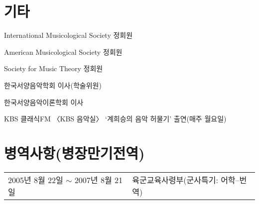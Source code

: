 \documentclass[dvipdfmx,a4paper]{article}
\begin{document}
  \vspace{2.5mm}
  
  \section*{\normalsize 기타}
  
  
  
  \noindent \hspace{2mm} \textbullet \hspace{2mm} International Musicological Society 정회원
  
  \noindent \hspace{2mm} \textbullet \hspace{2mm} American Musicological Society 정회원
  
  \noindent \hspace{2mm} \textbullet \hspace{2mm} Society for Music Theory 정회원
  
  \noindent \hspace{2mm} \textbullet \hspace{2mm} 한국서양음악학회 이사(학술위원)
  
  \noindent \hspace{2mm} \textbullet \hspace{2mm} 한국서양음악이론학회 이사
  
  \noindent \hspace{2mm} \textbullet \hspace{2mm} KBS 클래식FM 〈KBS 음악실〉 ‘계희승의 음악 허물기’ 출연(매주 월요일)


  \vspace{2.5mm}
  
  \section*{\normalsize 병역사항(병장만기전역)}
  
  \hspace*{-0.25cm}
  \begin{tabular}{p{5.5cm} l}
    2005년 8월 22일 $\sim$ 2007년 8월 21일 & 육군교육사령부(군사특기: 어학--번역)
  \end{tabular}
\end{document}
